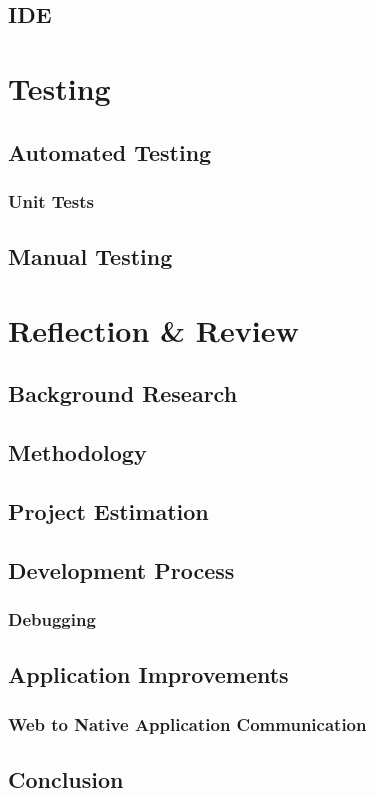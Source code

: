 \documentclass[]{report}
\begin{document}
		\section{IDE}
\chapter{Testing}
	\section{Automated Testing}
		\subsection{Unit Tests}
	\section{Manual Testing}
\chapter{Reflection \& Review}
	\section{Background Research}
	\section{Methodology}
	\section{Project Estimation}
	\section{Development Process}
		\subsection{Debugging}
	\section{Application Improvements}
		\subsection{Web to Native Application Communication}
	\section{Conclusion}
\end{document}
